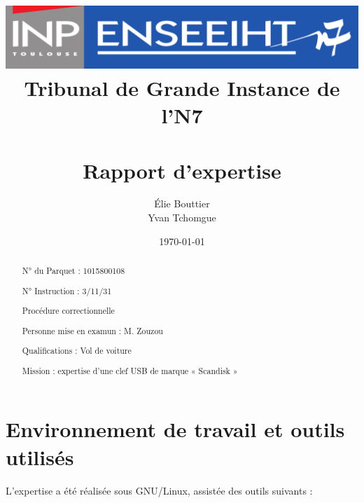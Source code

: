 \documentclass[a4paper,11pt]{article}
\title{\includegraphics{inp-enseeiht.png} \\ Tribunal de Grande Instance de l’N7 \\ ~ \\ Rapport d’expertise}
\author{Élie {\sc Bouttier}\\Yvan {\sc Tchomgue}}
\date\today
\begin{document}
\maketitle

\vspace{2cm}

\begin{abstract}
    N° du Parquet : 1015800108

    N° Instruction : 3/11/31

    Procédure correctionnelle

    Personne mise en examun : M. {\sc Zouzou}

    Qualifications : Vol de voiture

    Mission : expertise d’une clef USB de marque « Scandisk »
\end{abstract}

\vspace{2cm}

\tableofcontents

\newpage

\section{Environnement de travail et outils utilisés}

L’expertise a été réalisée sous GNU/Linux, assistée des outils suivants :
\end{document}
